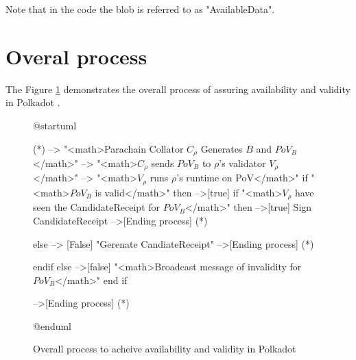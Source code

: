 Note that in the code the blob is referred to as "AvailableData".

\section{Overal process}

The Figure \ref{diag-anv-overall} demonstrates the overall process of assuring
availability and validity in Polkadot .

\begin{figure}[h!]
\label{diag-anv-overall}
\begin{plantuml}
@startuml

(*) --> "<math>Parachain Collator $C_\rho$ Generates  $B$ and $PoV_B$</math>"
    --> "<math>$C_\rho$ sends $PoV_B$ to $\rho$'s validator $V_\rho$</math>"
    --> "<math>$V_{\rho}$ runs $\rho$'s runtime on PoV</math>"
    if "<math>$PoV_B$ is valid</math>" then
    -->[true] if  "<math>$V_{\rho}$ have seen the CandidateReceipt for $PoV_B$</math>" then
    -->[true] Sign CandidateReceipt
    -->[Ending process] (*)

    else
    --> [False] "Gerenate CandiateReceipt"
    -->[Ending process] (*)

    endif
    else
    -->[false] "<math>Broadcast message of invalidity for $PoV_B$</math>"
    end if

  -->[Ending process] (*)

@enduml
\end{plantuml}
\caption{Overall process to acheive availability and validity in Polkadot}
\end{figure}
